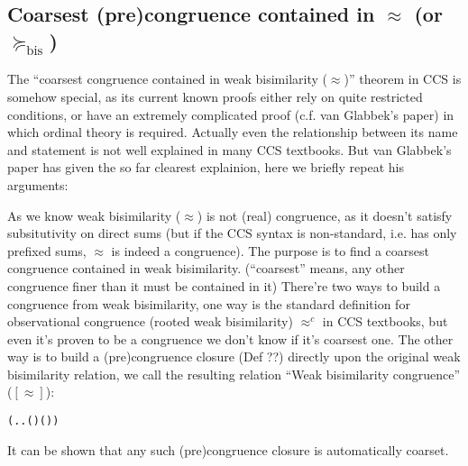 \subsection{Coarsest (pre)congruence contained in $\approx$ (or $\succeq_{\mathrm{bis}}$)}

The ``coarsest congruence contained in weak bisimilarity ($\approx$)''
theorem in CCS is somehow special, as its current known proofs either
rely on quite restricted conditions, or have an extremely complicated proof
(c.f. van Glabbek's paper) in
which ordinal theory is required.  Actually even the relationship
between its name and statement is not well explained in many CCS
textbooks. But van Glabbek's paper has given the so far clearest
explainion, here we briefly repeat his arguments:

As we know weak bisimilarity ($\approx$) is not (real) congruence, as
it doesn't satisfy subsitutivity on direct sums (but if the CCS syntax
is non-standard, i.e. has only prefixed sums, $\approx$ is indeed a
congruence). The purpose is to find a coarsest congruence contained in
weak bisimilarity. (``coarsest'' means, any other congruence finer than it must be contained in it)
There're two ways to build a congruence from weak bisimilarity, one
way is the standard definition for observational congruence (rooted
weak bisimilarity) $\approx^c$ in CCS textbooks, but even it's proven to be a
congruence we don't know if it's coarsest one.  The other way is to
build a (pre)congruence closure (Def ??) directly upon
the original weak bisimilarity relation, we call the resulting
relation ``Weak bisimilarity congruence'' ($[\approx]$):
\begin{alltt}
 \HOLSymConst{=}  
  \HOLSymConst{=} (\HOLTokenLambda{} . \HOLSymConst{\HOLTokenForall{}}.   \HOLSymConst{\HOLTokenImp{}}  ( ) ( ))
\end{alltt}
It can be shown that any such (pre)congruence closure is automatically coarset.

